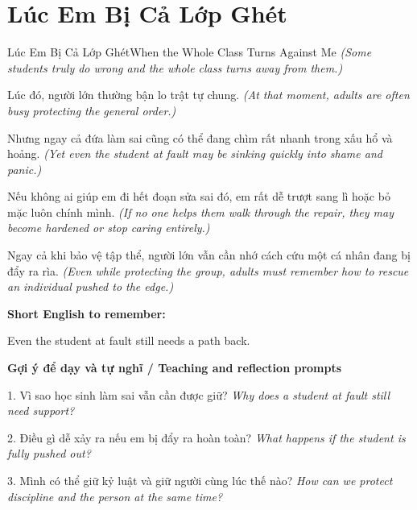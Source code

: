 \section{Lúc Em Bị Cả Lớp Ghét}
\begin{truyen}{Lúc Em Bị Cả Lớp Ghét}{When the Whole Class Turns Against Me}
\textit{(Some students truly do wrong and the whole class turns away from them.)}

Lúc đó, người lớn thường bận lo trật tự chung.
\textit{(At that moment, adults are often busy protecting the general order.)}

Nhưng ngay cả đứa làm sai cũng có thể đang chìm rất nhanh trong xấu hổ và hoảng.
\textit{(Yet even the student at fault may be sinking quickly into shame and panic.)}

Nếu không ai giúp em đi hết đoạn sửa sai đó, em rất dễ trượt sang lì hoặc bỏ mặc luôn chính mình.
\textit{(If no one helps them walk through the repair, they may become hardened or stop caring entirely.)}

\end{truyen}

\begin{baihoc}
Ngay cả khi bảo vệ tập thể, người lớn vẫn cần nhớ cách cứu một cá nhân đang bị đẩy ra rìa.
\textit{(Even while protecting the group, adults must remember how to rescue an individual pushed to the edge.)}
\end{baihoc}

\begin{ghinhoanh}
\textbf{Short English to remember:}

Even the student at fault still needs a path back.

\end{ghinhoanh}

\begin{tuhocnhanh}
\textbf{Gợi ý để dạy và tự nghĩ / Teaching and reflection prompts}

1. Vì sao học sinh làm sai vẫn cần được giữ? \textit{Why does a student at fault still need support?}

2. Điều gì dễ xảy ra nếu em bị đẩy ra hoàn toàn? \textit{What happens if the student is fully pushed out?}

3. Mình có thể giữ kỷ luật và giữ người cùng lúc thế nào? \textit{How can we protect discipline and the person at the same time?}
\end{tuhocnhanh}
\ngancach

